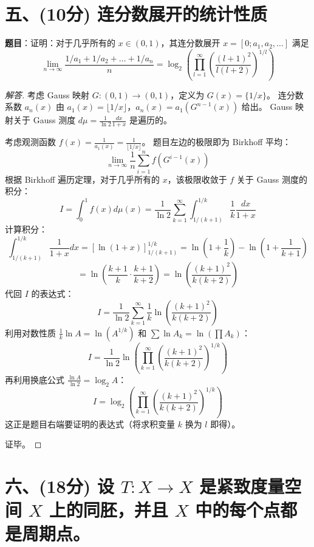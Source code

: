 \documentclass[a4paper,12pt]{article}
\newenvironment{solution}{\begin{proof}[解答]}{\end{proof}}
\begin{document}
\section*{五、(10分) 连分数展开的统计性质}

\textbf{题目}：证明：对于几乎所有的 $x \in (0, 1)$，其连分数展开 $x = [0; a_1, a_2, \dots]$ 满足
$$ \lim_{n\to\infty} \frac{1/a_1 + 1/a_2 + \dots + 1/a_n}{n} = \log_2 \left( \prod_{l=1}^\infty \left( \frac{(l+1)^2}{l(l+2)} \right)^{1/l} \right) $$

\begin{solution}
    考虑 Gauss 映射 $G: (0, 1) \to (0, 1)$，定义为 $G(x) = \{1/x\}$。
    连分数系数 $a_n(x)$ 由 $a_1(x) = \lfloor 1/x \rfloor$，$a_n(x) = a_1(G^{n-1}(x))$ 给出。
    Gauss 映射关于 Gauss 测度 $d\mu = \frac{1}{\ln 2} \frac{dx}{1+x}$ 是遍历的。
    
    考虑观测函数 $f(x) = \frac{1}{a_1(x)} = \frac{1}{\lfloor 1/x \rfloor}$。
    题目左边的极限即为 Birkhoff 平均：
    $$ \lim_{n\to\infty} \frac{1}{n} \sum_{i=1}^n f(G^{i-1}(x)) $$
    根据 Birkhoff 遍历定理，对于几乎所有的 $x$，该极限收敛于 $f$ 关于 Gauss 测度的积分：
    $$ I = \int_0^1 f(x) d\mu(x) = \frac{1}{\ln 2} \sum_{k=1}^\infty \int_{1/(k+1)}^{1/k} \frac{1}{k} \frac{dx}{1+x} $$
    计算积分：
    $$ \int_{1/(k+1)}^{1/k} \frac{1}{1+x} dx = \left[ \ln(1+x) \right]_{1/(k+1)}^{1/k} = \ln(1+\frac{1}{k}) - \ln(1+\frac{1}{k+1}) $$
    $$ = \ln \left( \frac{k+1}{k} \cdot \frac{k+1}{k+2} \right) = \ln \left( \frac{(k+1)^2}{k(k+2)} \right) $$
    代回 $I$ 的表达式：
    $$ I = \frac{1}{\ln 2} \sum_{k=1}^\infty \frac{1}{k} \ln \left( \frac{(k+1)^2}{k(k+2)} \right) $$
    利用对数性质 $\frac{1}{k} \ln A = \ln (A^{1/k})$ 和 $\sum \ln A_k = \ln (\prod A_k)$：
    $$ I = \frac{1}{\ln 2} \ln \left( \prod_{k=1}^\infty \left( \frac{(k+1)^2}{k(k+2)} \right)^{1/k} \right) $$
    再利用换底公式 $\frac{\ln A}{\ln 2} = \log_2 A$：
    $$ I = \log_2 \left( \prod_{k=1}^\infty \left( \frac{(k+1)^2}{k(k+2)} \right)^{1/k} \right) $$
    这正是题目右端要证明的表达式（将求积变量 $k$ 换为 $l$ 即得）。
    
    证毕。
\end{solution}

\section*{六、(18分) 设 $T: X \to X$ 是紧致度量空间 $X$ 上的同胚，并且 $X$ 中的每个点都是周期点。}
\end{document}
